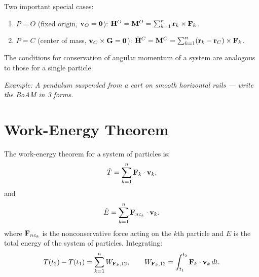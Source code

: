 \documentclass[
  letterpaper,
  DIV=11,
  numbers=noendperiod]{scrreprt}
\providecommand{\tightlist}{%
  \setlength{\itemsep}{0pt}\setlength{\parskip}{0pt}}
\begin{document}
Two important special cases:

\begin{enumerate}
\def\labelenumi{\arabic{enumi}.}
\tightlist
\item
  \(P = O\) (fixed origin, \({\bf v}_O = {\bf 0}\)):
  \(\dot{\bf H}^O = {\bf M}^O = \sum_{k=1}^n{\bf r}_k\times{\bf F}_k\).
\item
  \(P = C\) (center of mass, \({\bf v}_C\times{\bf G} = {\bf 0}\)):
  \(\dot{\bf H}^C = {\bf M}^C = \sum_{k=1}^n({\bf r}_k-{\bf r}_C)\times{\bf F}_k\).
\end{enumerate}

\begin{tcolorbox}[enhanced jigsaw, arc=.35mm, bottomrule=.15mm, bottomtitle=1mm, breakable, colback=white, colbacktitle=quarto-callout-important-color!10!white, colframe=quarto-callout-important-color-frame, coltitle=black, left=2mm, leftrule=.75mm, opacityback=0, opacitybacktitle=0.6, rightrule=.15mm, title=\textcolor{quarto-callout-important-color}{\faExclamation}\hspace{0.5em}{Note!}, titlerule=0mm, toprule=.15mm, toptitle=1mm]

The conditions for conservation of angular momentum of a system are
analogous to those for a single particle.

\end{tcolorbox}

\emph{Example: A pendulum suspended from a cart on smooth horizontal
rails --- write the BoAM in 3 forms.}

\section{Work-Energy Theorem}\label{work-energy-theorem}

The work-energy theorem for a system of particles is: \begin{align}
    \dot{T} = \sum_{k=1}^n{\bf F}_k\cdot{\bf v}_k,
\end{align} and \begin{align}
    \dot{E} = \sum_{k=1}^n{\bf F}_{nc_k}\cdot{\bf v}_k.
\end{align} where \({\bf F}_{nc_k}\) is the nonconservative force acting
on the \(k\)th particle and \(E\) is the total energy of the system of
particles. Integrating: \begin{align}
    T(t_2)-T(t_1) = \sum_{k=1}^n W_{{\bf F}_k,12}, \qquad W_{{\bf F}_k,12} = \int_{t_1}^{t_2}{\bf F}_k\cdot{\bf v}_k\,dt.
\end{align}
\end{document}
